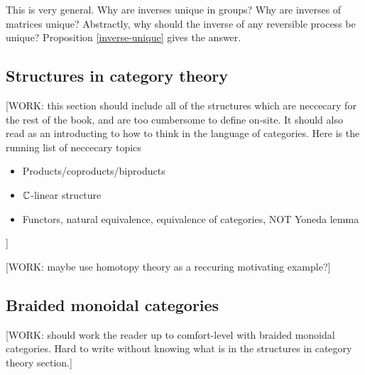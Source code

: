 \documentclass{article}
\theoremstyle{definition}
\numberwithin{figure}{section}
\begin{document}
This is very general. Why are inverses unique in groups? Why are inverses of matrices unique? Abstractly, why should the inverse of any reversible process be unique? Proposition \ref{inverse-unique} gives the answer.

\subsection{Structures in category theory}

[WORK: this section should include all of the structures which are neccecary for the rest of the book,
and are too cumbersome to define on-site. It should also read as an introducting to how to think in the language of categories. Here is the running list of neccecary topics

\begin{itemize}
\item Products/coproducts/biproducts
\item $\mathbb{C}$-linear structure
\item Functors, natural equivalence, equivalence of categories, NOT Yoneda lemma
\end{itemize}
]

[WORK: maybe use homotopy theory as a reccuring motivating example?]

\subsection{Braided monoidal categories}

[WORK: should work the reader up to comfort-level with braided monoidal categories. Hard to write without knowing what is in the structures in category theory section.]
\end{document}
